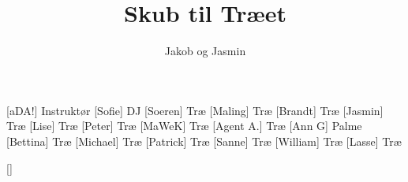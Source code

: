 \documentclass[a4paper,11pt]{article}
\title{Skub til Træet}
\author{Jakob og Jasmin}
\begin{document}
\maketitle

\begin{roles}
[aDA!] Instruktør
[Sofie] DJ
[Soeren] Træ
[Maling] Træ
[Brandt] Træ
[Jasmin] Træ
[Lise] Træ
[Peter] Træ
[MaWeK] Træ
[Agent A.] Træ
[Ann G] Palme
[Bettina] Træ
[Michael] Træ
[Patrick] Træ
[Sanne] Træ
[William] Træ
[Lasse] Træ
\end{roles}

\begin{props}
[]
\end{props}

\begin{song}
\end{song}
\end{document}
